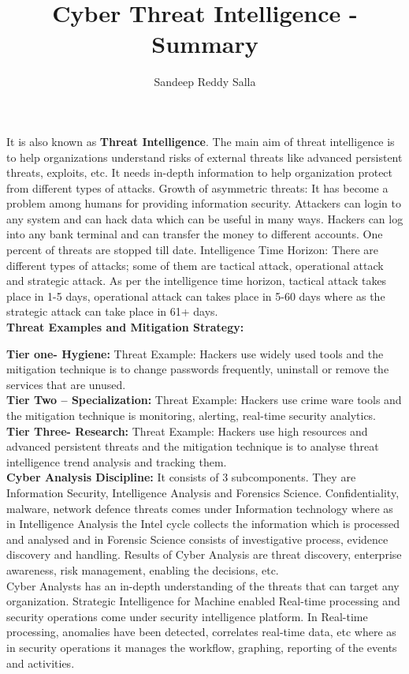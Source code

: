 \documentclass{article}
\title{Cyber Threat Intelligence - Summary}
\author{Sandeep Reddy Salla}
\begin{document}
\maketitle

It is also known as \textbf{Threat Intelligence}. The main aim of threat intelligence is to help organizations understand risks of external threats like advanced persistent threats, exploits, etc.  It needs in-depth information to help organization protect from different types of attacks.
Growth of asymmetric threats: It has become a problem among humans for providing information security. Attackers can login to any system and can hack data which can be useful in many ways.  Hackers can log into any bank terminal and can transfer the money to different accounts.
One percent of threats are stopped till date.
Intelligence Time Horizon:
There are different types of attacks; some of them are tactical attack, operational attack and strategic attack. As per the intelligence time horizon, tactical attack takes place in 1-5 days, operational attack can takes place in 5-60 days where as the strategic attack can take place in 61+ days.\\

\textbf{Threat Examples and Mitigation Strategy:}

\textbf{Tier one- Hygiene:} 
Threat Example: Hackers use widely used tools and the mitigation technique is to change passwords frequently, uninstall or remove the services that are unused.\\
\textbf{Tier Two – Specialization:}
Threat Example: Hackers use crime ware tools and the mitigation technique is monitoring, alerting, real-time security analytics.\\
\textbf{Tier Three- Research:} 
Threat Example:  Hackers use high resources and advanced persistent threats and the mitigation technique is to analyse threat intelligence trend analysis and tracking them.\\

\textbf{Cyber Analysis Discipline:} 
It consists of 3 subcomponents. They are Information Security, Intelligence Analysis and Forensics Science. Confidentiality, malware, network defence threats comes under Information technology where as in Intelligence Analysis the Intel cycle collects the information which is processed and analysed and in Forensic Science consists of investigative process, evidence discovery and handling.
Results of Cyber Analysis are threat discovery, enterprise awareness, risk management, enabling the decisions, etc.\\
Cyber Analysts has an in-depth understanding of the threats that can target any organization.
Strategic Intelligence for Machine enabled
Real-time processing and security operations come under security intelligence platform. In Real-time processing, anomalies have been detected, correlates real-time data, etc where as in security operations it manages the workflow, graphing, reporting of the events and activities.\\
\end{document}
